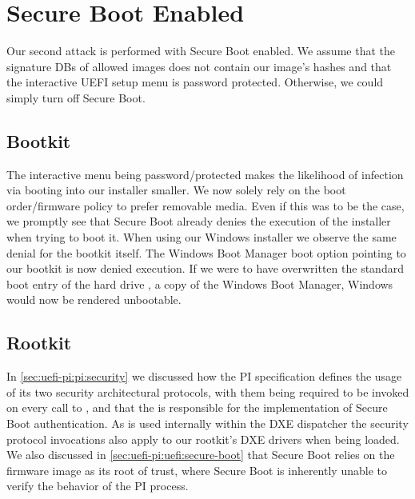 
\section{Secure Boot Enabled}
\label{sec:attacks:secure-boot}

Our second attack is performed with Secure Boot enabled.
We assume that the signature \acp{DB} of allowed images does not contain our image's hashes and that the interactive \ac{UEFI} setup menu is password protected.
Otherwise, we could simply turn off Secure Boot.

\subsection{Bootkit}

The interactive menu being password\-/protected makes the likelihood of infection via booting into our installer smaller.
We now solely rely on the boot order/firmware policy to prefer removable media.
Even if this was to be the case, we promptly see that Secure Boot already denies the execution of the installer when trying to boot it.
When using our Windows installer we observe the same denial for the bootkit itself.
The Windows Boot Manager boot option pointing to our bootkit is now denied execution.
If we were to have overwritten the standard boot entry of the hard drive , a copy of the Windows Boot Manager, Windows would now be rendered unbootable.

\subsection{Rootkit}

In \autoref{sec:uefi-pi:pi:security} we discussed how the \ac{PI} specification defines the usage of its two security architectural protocols, with them being required to be invoked on every call to , and that the  is responsible for the implementation of Secure Boot authentication.
As  is used internally within the \ac{DXE} dispatcher the security protocol invocations also apply to our rootkit's \ac{DXE} drivers when being loaded.
We also discussed in \autoref{sec:uefi-pi:uefi:secure-boot} that Secure Boot relies on the firmware image as its root of trust, where Secure Boot is inherently unable to verify the behavior of the \ac{PI} process.

